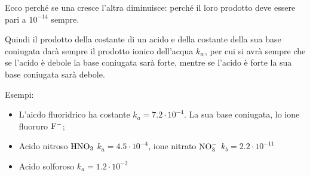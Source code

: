 Ecco perché se una cresce l'altra diminuisce: perché il loro prodotto deve essere pari a $10^{-14}$ sempre.

Quindi il prodotto della costante di un acido e della costante della sua base coniugata darà sempre il prodotto ionico dell'acqua $k_w$, per cui si avrà sempre che se l'acido è debole la base coniugata sarà forte, mentre se l'acido è forte la sua base coniugata sarà debole.

\vspace{0.2cm}Esempi:
\begin{itemize}
    \item L'aicdo fluoridrico ha costante $k_a=7.2 \cdot 10^{-4}$. La sua base coniugata, lo ione fluoruro $\rm F^-$;
    \item Acido nitroso $\rm HNO_3$ $k_a=4.5 \cdot 10^{-4}$, ione nitrato $\rm NO_3^-$ $k_b=2.2 \cdot 10^{-11}$
    \item Acido solforoso  $k_a=1.2 \cdot 10^{-2}$
\end{itemize}
